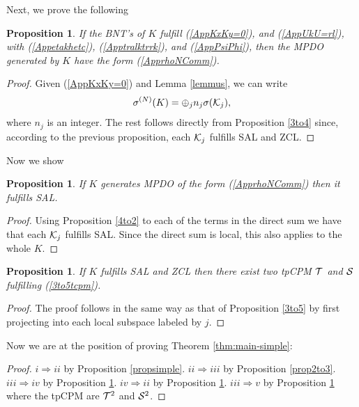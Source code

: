 \documentclass{elsarticle}
\newcommand{\be}{\begin{equation}}
\newcommand{\ee}{\end{equation}}
\newtheorem{prop}[thm]{Proposition}
\begin{document}
Next, we prove the following

\begin{prop}
\label{prop3to4}
If the BNT's of $K$ fulfill (\ref{AppKxKy=0}), and (\ref{AppUkU=rl}), with (\ref{Appetakhetc}), (\ref{Apptralktrrk}), and (\ref{AppPsiPhi}), then the MPDO generated by $K$ have the form (\ref{ApprhoNComm}).
\end{prop}

\begin{proof}
Given (\ref{AppKxKy=0}) and Lemma \ref{lemmus}, we can write
 \be
 \sigma^{(N)}(K)=\oplus_j n_j \sigma({\cal K}_j),
 \ee
where $n_j$ is an integer. The rest follows directly from Proposition \ref{3to4} since, according to the previous proposition, each ${\cal K}_j$ fulfills SAL and ZCL.
\end{proof}

Now we show

\begin{prop}
\label{prop4to2}
If $K$ generates MPDO of the form (\ref{ApprhoNComm}) then it fulfills SAL.
\end{prop}

\begin{proof}
Using Proposition \ref{4to2} to each of the terms in the direct sum we have that each ${\cal K}_j$ fulfills SAL. Since the direct sum is local, this also applies to the whole $K$.
\end{proof}

\begin{prop}
\label{prop2to5}
If $K$ fulfills SAL and ZCL then there exist two tpCPM ${\cal T}$ and ${\cal S}$ fulfilling (\ref{3to5tcpm}).
\end{prop}

\begin{proof}
The proof follows in the same way as that of Proposition \ref{3to5} by first projecting into each local subspace labeled by $j$.
\end{proof}

Now we are at the position of proving Theorem \ref{thm:main-simple}:

\begin{proof}
$i \Rightarrow ii $ by Proposition \ref{propsimple}.
$ii \Rightarrow iii$ by Proposition \ref{prop2to3}.
$iii \Rightarrow iv$ by Proposition \ref{prop3to4}. $iv \Rightarrow ii$ by Proposition \ref{prop4to2}. $iii \Rightarrow v$ by Proposition \ref{prop2to5} where the tpCPM are ${\cal T}^2$ and ${\cal S}^2$.
\end{proof}
\end{document}

